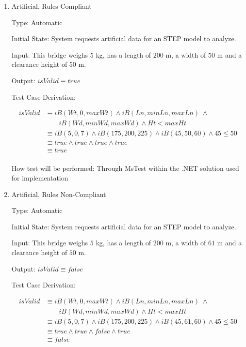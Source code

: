 \documentclass[12pt, titlepage]{article}
\begin{document}
\begin{enumerate}

\item{Artificial, Rules Compliant\\}

Type: Automatic
					
Initial State: System requests artificial data for an STEP model to analyze.
					
Input: This bridge weighs $5$ kg, has a length of $200$ m, a width of $50$ m and a clearance height of $50$ m. 
					
Output: $isValid \equiv true$

Test Case Derivation: 

\begin{align*}
isValid &\equiv iB(Wt, 0, maxWt) \land iB(Ln, minLn, maxLn) \; \land \\ 
        & \qquad iB(Wd, minWd, maxWd) \land Ht < maxHt \\
        &\equiv iB(5, 0, 7) \land iB(175, 200, 225) \land iB(45, 50, 60) \land 45 \le 50 \\
        &\equiv true \land true \land true \land true \\
        &\equiv true \\
\end{align*}

How test will be performed: Through MsTest within the .NET solution used for implementation

\item{Artificial, Rules Non-Compliant\\}

Type: Automatic
					
Initial State: System requests artificial data for an STEP model to analyze.
					
Input: This bridge weighs $5$ kg, has a length of $200$ m, a width of $61$ m and a clearance height of $50$ m. 
					
Output: $isValid \equiv false$

Test Case Derivation: 

\begin{align*}
isValid &\equiv iB(Wt, 0, maxWt) \land iB(Ln, minLn, maxLn) \; \land \\ 
        & \qquad iB(Wd, minWd, maxWd) \land Ht < maxHt \\
        &\equiv iB(5, 0, 7) \land iB(175, 200, 225) \land iB(45, 61, 60) \land 45 \le 50 \\
        &\equiv true \land true \land false \land true \\
        &\equiv false \\
\end{align*}


\end{enumerate}
\end{document}
